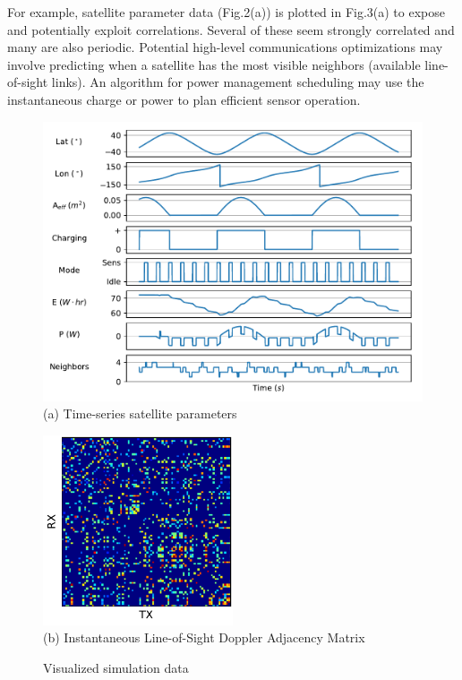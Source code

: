 \documentclass[conference]{IEEEtran}
\begin{document}
For example, satellite parameter data (Fig.2(a)) is plotted in Fig.3(a) to
expose and potentially exploit correlations.  Several of these seem strongly
correlated and many are also periodic.  Potential high-level communications
optimizations may involve predicting when a satellite has the most visible
neighbors (available line-of-sight links).  An algorithm for power management
scheduling may use the instantaneous charge or power to plan efficient sensor
operation.

\begin{figure}[t]
  \begin{minipage}[b]{\linewidth}
    \begin{center}
      \includegraphics[width=\textwidth]{images/param_plot.pdf} \\
      {\footnotesize(a) Time-series satellite parameters}
    \end{center}
    \medskip
  \end{minipage}
  \begin{minipage}[b]{\linewidth}
    \begin{center}
      \includegraphics[width=0.5\textwidth]{images/weighted_plot.pdf} \\
      {\footnotesize(b) Instantaneous Line-of-Sight Doppler Adjacency Matrix}
    \end{center}
  \end{minipage}
  \caption{Visualized simulation data}
  \label{fig:processing}
\end{figure}
\end{document}

